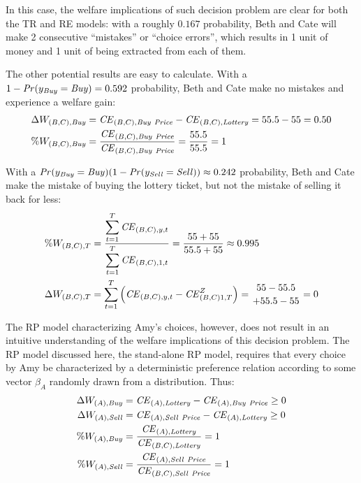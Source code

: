 \documentclass[../main.tex]{subfiles}
\begin{document}
In this case, the welfare implications of such decision problem are clear for both the TR and RE  models: with a roughly $0.167$ probability, Beth and Cate will make 2 consecutive \enquote{mistakes} or \enquote{choice errors}, which results in 1 unit of money and 1 unit of {\CE} being extracted from each of them.

The other potential results are easy to calculate.
With a ${1- {\mathit{Pr}}(y_{\mathit{Buy}}} = \mathit{Buy}) = 0.592$ probability, Beth and Cate make no mistakes and experience a welfare gain:
\begin{align}
	\begin{split}
		\Delta W_{(B,C),\mathit{Buy}} &= {\mathit{CE}}_{(B,C),\mathit{Buy\ Price}} - {\mathit{CE}}_{(B,C),\mathit{Lottery}} = 55.5 - 55 = 0.50\\
		\% W_{(B,C),\mathit{Buy}} &= \frac{{\mathit{CE}}_{(B,C),\mathit{Buy\ Price}}}{{\mathit{CE}}_{(B,C),\mathit{Buy\ Price}}} = \frac{55.5}{55.5} = 1
	\end{split}
\end{align}

With a $ {\mathit{Pr}}(y_{\mathit{Buy}} = \mathit{Buy})(1 - {\mathit{Pr}}(y_{\mathit{Sell}}= \mathit{Sell})) \approx 0.242$ probability, Beth and Cate make the mistake of buying the lottery ticket, but not the mistake of selling it back for less:
\begin{align}
	\begin{split}
		\%W_{(B,C),T} &= \frac{\displaystyle\sum_{t=1}^{T} {\CE}_{(B,C),y,t} }{\displaystyle\sum_{t=1}^{T} {\CE}_{(B,C),1,t}} = \frac{55 + 55}{55.5 + 55} \approx 0.995 \\
		\Delta W_{(B,C),T} &= \sum_{t=1}^T \left( {\CE}_{(B,C),y,t} - {\CE}_{(B,C)1,T}^Z \right)= \genfrac{}{}{0pt}{}{55 - 55.5}{+ 55.5 - 55} = 0
	\end{split}
\end{align}

The RP model characterizing Amy's choices, however, does not result in an intuitive understanding of the welfare implications of this decision problem.
The RP model discussed here, the stand-alone RP model, requires that every choice by Amy be characterized by a deterministic preference relation according to some vector $\beta_A$ randomly drawn from a distribution.
Thus:
\begin{align}
	\label{eq2:RP.welfare}
	\begin{split}
		\Delta W_{(A),\mathit{Buy}} &= {\mathit{CE}}_{(A),\mathit{Lottery}} - {\mathit{CE}}_{(A),\mathit{Buy\ Price}} \geq 0\\
		\Delta W_{(A),\mathit{Sell}} &= {\mathit{CE}}_{(A),\mathit{Sell\ Price}} - {\mathit{CE}}_{(A),\mathit{Lottery}} \geq 0\\
		\% W_{(A),\mathit{Buy}} &= \frac{{\mathit{CE}}_{(A),\mathit{Lottery}}}{{\mathit{CE}}_{(B,C),\mathit{Lottery}}} = 1\\
		\% W_{(A),\mathit{Sell}} &= \frac{{\mathit{CE}}_{(A),\mathit{Sell\ Price}}}{{\mathit{CE}}_{(B,C),\mathit{Sell\ Price}}} = 1
	\end{split}
\end{align}
\end{document}
